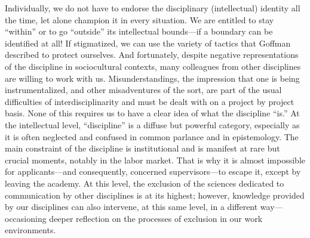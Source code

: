 \documentclass{tufte-handout}
\begin{document}
Individually, we do not have to endorse the disciplinary (intellectual)
identity all the time, let alone champion it in every situation. We are
entitled to stay ``within'' or to go ``outside'' its intellectual
bounds---if a boundary can be identified at all! If stigmatized, we can
use the variety of tactics that Goffman described to protect ourselves.
And fortunately, despite negative representations of the discipline in
sociocultural contexts, many colleagues from other disciplines are
willing to work with us. Misunderstandings, the impression that one is
being instrumentalized, and other misadventures of the sort, are part of
the usual difficulties of interdisciplinarity and must be dealt with on
a project by project basis. None of this requires us to have a clear
idea of what the discipline ``is.'' At the intellectual level,
``discipline'' is a diffuse but powerful category, especially as it is
often neglected and confused in common parlance and in epistemology. The
main constraint of the discipline is institutional and is manifest at
rare but crucial moments, notably in the labor market. That is why it is
almost impossible for applicants---and consequently, concerned
supervisors---to escape it, except by leaving the academy. At this
level, the exclusion of the sciences dedicated to communication by other
disciplines is at its highest; however, knowledge provided by our
disciplines can also intervene, at this same level, in a different
way---occasioning deeper reflection on the processes of exclusion in our
work environments.
\end{document}
